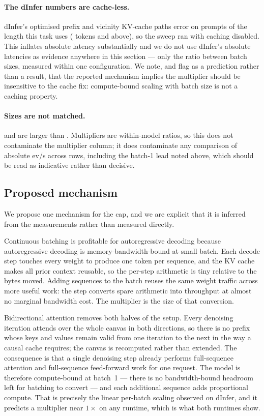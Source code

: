 \paragraph{The dInfer numbers are cache-less.}
dInfer's optimised prefix and vicinity KV-cache paths error on prompts of the
length this task uses (\dinferCachePromptLimit{} tokens and above), so the sweep
ran with caching disabled. This inflates absolute latency substantially and we
do not use dInfer's absolute latencies as evidence anywhere in this section ---
only the ratio between batch sizes, measured within one configuration. We note,
and flag as a prediction rather than a result, that the reported mechanism
implies the multiplier should be insensitive to the cache fix: compute-bound
scaling with batch size is not a caching property.

\paragraph{Sizes are not matched.} \modelDG{} and \modelLLaDA{} are larger than
\modelARthree{}. Multipliers are within-model ratios, so this does not
contaminate the multiplier column; it does contaminate any comparison of
absolute ev/s across rows, including the batch-1 lead noted above, which should
be read as indicative rather than decisive.

\subsection{Proposed mechanism}
\label{sec:mechanism:proposal}

We propose one mechanism for the cap, and we are explicit that it is inferred
from the measurements rather than measured directly.

Continuous batching is profitable for autoregressive decoding because
autoregressive decoding is memory-bandwidth-bound at small batch. Each decode
step touches every weight to produce one token per sequence, and the KV cache
makes all prior context reusable, so the per-step arithmetic is tiny relative to
the bytes moved. Adding sequences to the batch reuses the same weight traffic
across more useful work: the step converts spare arithmetic into throughput at
almost no marginal bandwidth cost. The multiplier is the size of that
conversion.

Bidirectional attention removes both halves of the setup. Every denoising
iteration attends over the whole canvas in both directions, so there is no
prefix whose keys and values remain valid from one iteration to the next in the
way a causal cache requires; the canvas is recomputed rather than extended. The
consequence is that a single denoising step already performs full-sequence
attention and full-sequence feed-forward work for one request. The model is
therefore compute-bound at batch~1 --- there is no bandwidth-bound headroom left
for batching to convert --- and each additional sequence adds proportional
compute. That is precisely the linear per-batch scaling observed on dInfer, and
it predicts a multiplier near $1\times$ on any runtime, which is what both
runtimes show.

